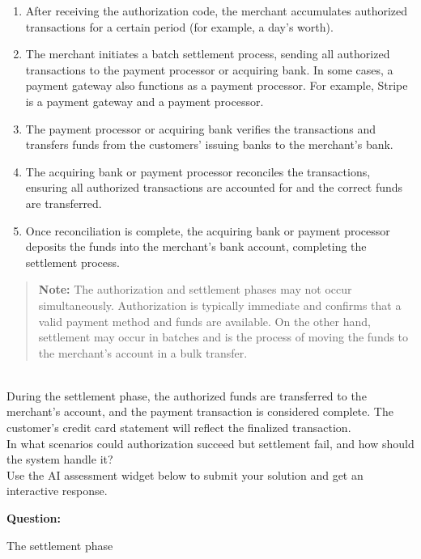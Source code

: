\begin{enumerate}
\item
\protect{}\label{RJ7zyp2EdvFj7qJxT4uop}
After receiving the authorization code, the merchant accumulates authorized transactions for a certain period (for example, a day's worth).
\item
\protect{}\label{_E2TbSSgV2A8DqPsxJtwY}
The merchant initiates a batch settlement process, sending all authorized transactions to the payment processor or acquiring bank. In some cases, a payment gateway also functions as a payment processor. For example, Stripe is a payment gateway and a payment processor.
\item
\protect{}\label{EqsdNUWCJmrCM1U-R9Y4y}
The payment processor or acquiring bank verifies the transactions and transfers funds from the customers' issuing banks to the merchant's bank.
\item
\protect{}\label{hunmcOI2ETzQLK6vuRJve}
The acquiring bank or payment processor reconciles the transactions, ensuring all authorized transactions are accounted for and the correct funds are transferred.
\item
\protect{}\label{iFrn5GQFcf4nQaME7dC9l}
Once reconciliation is complete, the acquiring bank or payment processor deposits the funds into the merchant's bank account, completing the settlement process.
\end{enumerate}
\begin{quote}
\textbf{Note:} The authorization and settlement phases may not occur simultaneously. Authorization is typically immediate and confirms that a valid payment method and funds are available. On the other hand, settlement may occur in batches and is the process of moving the funds to the merchant's account in a bulk transfer.
\end{quote}
\\
During the settlement phase, the authorized funds are transferred to the merchant's account, and the payment transaction is considered complete. The customer's credit card statement will reflect the finalized transaction.
\\
In what scenarios could authorization succeed but settlement fail, and how should the system handle it?
\\
Use the AI assessment widget below to submit your solution and get an interactive response.

\textbf{Question:}

The settlement phase

